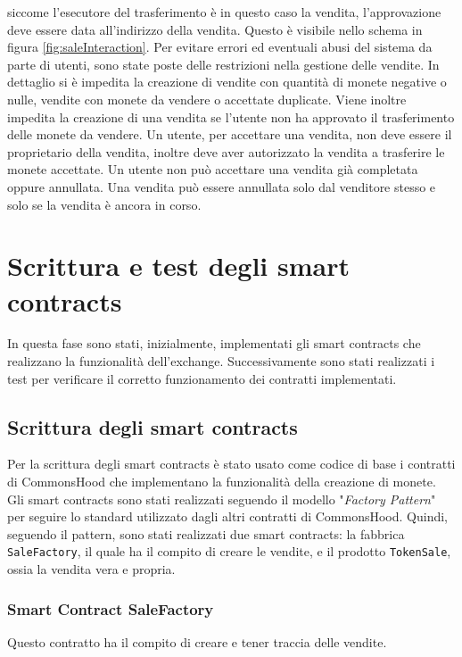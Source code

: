 \documentclass[a4paper]{article}
\begin{document}
        siccome l'esecutore del trasferimento è in questo caso la vendita, l'approvazione deve essere data all'indirizzo della vendita. Questo è visibile nello schema in figura \ref{fig:saleInteraction}.
        \newline
        Per evitare errori ed eventuali abusi del sistema da parte di utenti, sono state poste delle restrizioni nella gestione delle vendite. In dettaglio si è impedita la creazione di vendite con quantità di monete negative o nulle, vendite con monete da vendere o accettate duplicate.
        Viene inoltre impedita la creazione di una vendita se l'utente non ha approvato il trasferimento delle monete da vendere. Un utente, per accettare una vendita, non deve essere il proprietario della vendita, inoltre deve aver autorizzato la vendita a trasferire le monete accettate.
        Un utente non può accettare una vendita già completata oppure annullata. Una vendita può essere annullata solo dal venditore stesso e solo se la vendita è ancora in corso.

        \section{Scrittura e test degli smart contracts}
        In questa fase sono stati, inizialmente, implementati gli smart contracts che realizzano la funzionalità dell'exchange. Successivamente sono stati realizzati i test per verificare il corretto funzionamento dei contratti implementati.
        \subsection{Scrittura degli smart contracts}
        \label{writeContracts}
        Per la scrittura degli smart contracts è stato usato come codice di base i contratti di CommonsHood che implementano la funzionalità della creazione di monete.
        Gli smart contracts sono stati realizzati seguendo il modello "\emph{Factory Pattern}" per seguire lo standard utilizzato dagli altri contratti di CommonsHood. Quindi, seguendo il pattern, sono stati realizzati
        due smart contracts: la fabbrica \verb|SaleFactory|, il quale ha il compito di creare le vendite, e il prodotto \verb|TokenSale|, ossia la vendita vera e propria.
        \subsubsection{Smart Contract SaleFactory}
        Questo contratto ha il compito di creare e tener traccia delle vendite.
\end{document}
